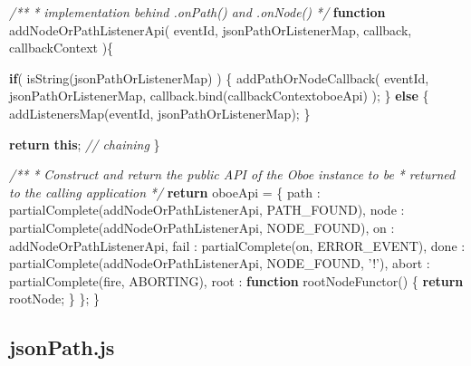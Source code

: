 \documentclass[]{article}
\newenvironment{Shaded}{}{}
\newcommand{\KeywordTok}[1]{\textcolor[rgb]{0.00,0.44,0.13}{\textbf{{#1}}}}
\newcommand{\DataTypeTok}[1]{\textcolor[rgb]{0.56,0.13,0.00}{{#1}}}
\newcommand{\StringTok}[1]{\textcolor[rgb]{0.25,0.44,0.63}{{#1}}}
\newcommand{\CommentTok}[1]{\textcolor[rgb]{0.38,0.63,0.69}{\textit{{#1}}}}
\newcommand{\OtherTok}[1]{\textcolor[rgb]{0.00,0.44,0.13}{{#1}}}
\newcommand{\FunctionTok}[1]{\textcolor[rgb]{0.02,0.16,0.49}{{#1}}}
\newcommand{\NormalTok}[1]{{#1}}
\begin{document}
\begin{Shaded}
\begin{Highlighting}[]
   \CommentTok{/**}
\CommentTok{    * implementation behind .onPath() and .onNode()}
\CommentTok{    */}       
   \KeywordTok{function} \FunctionTok{addNodeOrPathListenerApi}\NormalTok{( eventId, jsonPathOrListenerMap,}
                                      \NormalTok{callback, callbackContext )\{}
 
      \KeywordTok{if}\NormalTok{( }\FunctionTok{isString}\NormalTok{(jsonPathOrListenerMap) ) \{}
         \FunctionTok{addPathOrNodeCallback}\NormalTok{( }
            \NormalTok{eventId, }
            \NormalTok{jsonPathOrListenerMap, }
            \OtherTok{callback}\NormalTok{.}\FunctionTok{bind}\NormalTok{(callbackContext\textbar{}\textbar{}oboeApi)}
         \NormalTok{);}
      \NormalTok{\} }\KeywordTok{else} \NormalTok{\{}
         \FunctionTok{addListenersMap}\NormalTok{(eventId, jsonPathOrListenerMap);}
      \NormalTok{\}}
      
      \KeywordTok{return} \KeywordTok{this}\NormalTok{; }\CommentTok{// chaining}
   \NormalTok{\}}

   \CommentTok{/**}
\CommentTok{    * Construct and return the public API of the Oboe instance to be }
\CommentTok{    * returned to the calling application}
\CommentTok{    */}
   \KeywordTok{return} \NormalTok{oboeApi = \{ }
      \DataTypeTok{path  }\NormalTok{:  }\FunctionTok{partialComplete}\NormalTok{(addNodeOrPathListenerApi, PATH_FOUND), }
      \DataTypeTok{node  }\NormalTok{:  }\FunctionTok{partialComplete}\NormalTok{(addNodeOrPathListenerApi, NODE_FOUND),}
      \DataTypeTok{on    }\NormalTok{:  addNodeOrPathListenerApi,}
      \DataTypeTok{fail  }\NormalTok{:  }\FunctionTok{partialComplete}\NormalTok{(on, ERROR_EVENT),}
      \DataTypeTok{done  }\NormalTok{:  }\FunctionTok{partialComplete}\NormalTok{(addNodeOrPathListenerApi, NODE_FOUND, }\StringTok{'!'}\NormalTok{),}
      \DataTypeTok{abort }\NormalTok{:  }\FunctionTok{partialComplete}\NormalTok{(fire, ABORTING),}
      \DataTypeTok{root  }\NormalTok{:  }\KeywordTok{function} \FunctionTok{rootNodeFunctor}\NormalTok{() \{}
                  \KeywordTok{return} \NormalTok{rootNode;}
               \NormalTok{\}}
   \NormalTok{\};}
\NormalTok{\}}
\end{Highlighting}
\end{Shaded}

\pagebreak

\subsection{jsonPath.js}
\end{document}
